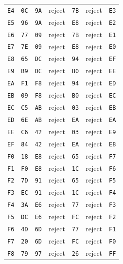 \begin{longtable}{lllllll}
\texttt{E4} & \texttt{0C} & \texttt{9A} & reject & \texttt{7B} & reject & \texttt{E3}\\
\texttt{E5} & \texttt{96} & \texttt{9A} & reject & \texttt{E8} & reject & \texttt{E2}\\
\texttt{E6} & \texttt{77} & \texttt{09} & reject & \texttt{7B} & reject & \texttt{E1}\\
\texttt{E7} & \texttt{7E} & \texttt{09} & reject & \texttt{E8} & reject & \texttt{E0}\\
\texttt{E8} & \texttt{65} & \texttt{DC} & reject & \texttt{94} & reject & \texttt{EF}\\
\texttt{E9} & \texttt{B9} & \texttt{DC} & reject & \texttt{B0} & reject & \texttt{EE}\\
\texttt{EA} & \texttt{F1} & \texttt{F8} & reject & \texttt{94} & reject & \texttt{ED}\\
\texttt{EB} & \texttt{09} & \texttt{F8} & reject & \texttt{B0} & reject & \texttt{EC}\\
\texttt{EC} & \texttt{C5} & \texttt{AB} & reject & \texttt{03} & reject & \texttt{EB}\\
\texttt{ED} & \texttt{6E} & \texttt{AB} & reject & \texttt{EA} & reject & \texttt{EA}\\
\texttt{EE} & \texttt{C6} & \texttt{42} & reject & \texttt{03} & reject & \texttt{E9}\\
\texttt{EF} & \texttt{84} & \texttt{42} & reject & \texttt{EA} & reject & \texttt{E8}\\
\texttt{F0} & \texttt{18} & \texttt{E8} & reject & \texttt{65} & reject & \texttt{F7}\\
\texttt{F1} & \texttt{F0} & \texttt{E8} & reject & \texttt{1C} & reject & \texttt{F6}\\
\texttt{F2} & \texttt{7D} & \texttt{91} & reject & \texttt{65} & reject & \texttt{F5}\\
\texttt{F3} & \texttt{EC} & \texttt{91} & reject & \texttt{1C} & reject & \texttt{F4}\\
\texttt{F4} & \texttt{3A} & \texttt{E6} & reject & \texttt{77} & reject & \texttt{F3}\\
\texttt{F5} & \texttt{DC} & \texttt{E6} & reject & \texttt{FC} & reject & \texttt{F2}\\
\texttt{F6} & \texttt{4D} & \texttt{6D} & reject & \texttt{77} & reject & \texttt{F1}\\
\texttt{F7} & \texttt{20} & \texttt{6D} & reject & \texttt{FC} & reject & \texttt{F0}\\
\texttt{F8} & \texttt{79} & \texttt{97} & reject & \texttt{26} & reject & \texttt{FF}\\

\end{longtable}
